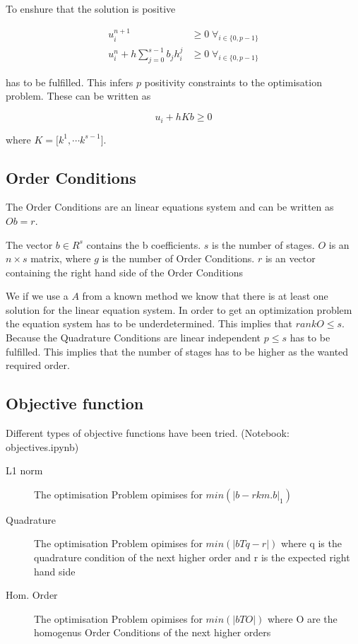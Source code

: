 \documentclass{article}
\begin{document}
To enshure that the solution is positive 

\begin{align}
 u_i^{n+1} &\geq 0   \;   \forall_{i \in \{0,p-1 \}}  \\
 u_i^n + h \sum_{j=0}^{s-1} b_j h_i^j  &\geq 0   \;   \forall_{i \in \{0,p-1 \}}  
\end{align}

has to be fulfilled.
This infers $p$ positivity constraints to the optimisation problem. These can be written as

\begin{equation}
u_i + h K  b \geq 0     
\end{equation}

where $K = \big[k^1 , \cdots k^{s-1}\big]$.




\subsection{Order Conditions}

The Order Conditions are an linear equations system and can be written as $O b = r$. 

The vector $b \in R^s$ contains the b coefficients. $s$ is the number of stages. $O$ is an $n \times s$ matrix, where $g$ is the number of Order Conditions. $r$ is an vector containing the right hand side of the Order Conditions

We if we use a $A$ from a known method we know that there is at least one solution for the linear equation system.
In order to get an optimization problem the equation system has to be underdetermined.
This implies that $rank{O} \leq s$. 
Because the Quadrature Conditions are linear independent $p \leq s$ has to be fulfilled.
This implies that the number of stages has to be higher as the wanted required order.

\subsection{Objective function}
Different types of objective functions have been tried. (Notebook: objectives.ipynb)

\begin{description}

\item[L1 norm] The optimisation Problem opimises for $min(|b-rkm.b|_1)$
            
\item[Quadrature]   The optimisation Problem opimises for $min(|bTq-r|)$
                            where q is the quadrature condition of the next higher order 
                            and r is the expected right hand side
            
\item[Hom. Order]    The optimisation Problem opimises for $min(|bTO|)$ where O are the homogenus Order Conditions of the next higher orders
                            
 
\end{description}
\end{document}
